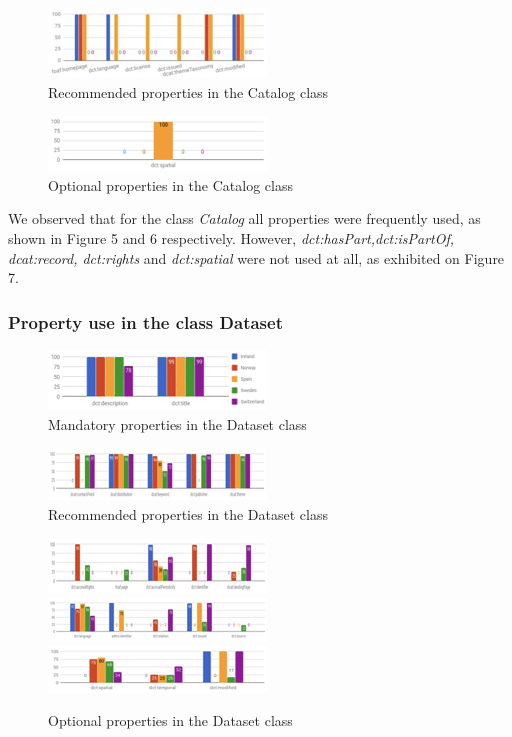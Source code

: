 \documentclass[<options>]{elsarticle}
\begin{document}
\begin{figure}[H]
\includegraphics{replace5.png}
\caption{Recommended properties in the Catalog class}
\end{figure}

\begin{figure}[H]
\includegraphics{Replace6.png}
\caption{Optional properties in the Catalog class}
\end{figure}

We observed that for the class \textit{Catalog} all properties were frequently used, as shown in Figure 5 and 6 respectively. However, \textit{dct:hasPart,dct:isPartOf, dcat:record, dct:rights} and \textit{dct:spatial} were not used at all, as exhibited on Figure 7.

\subsubsection{Property use in the class Dataset}

\begin{figure}[H]
\includegraphics{replace7.png}
\caption{Mandatory properties in the Dataset class}
\end{figure}

\begin{figure}[H]
\includegraphics{replace8.png}
\caption{Recommended properties in the Dataset class}
\end{figure}

\begin{figure}[H]
\includegraphics{replace9.png}
\includegraphics{replace10.png}
\includegraphics{replace11.png}
\caption{Optional properties in the Dataset class}
\end{figure}
\end{document}
